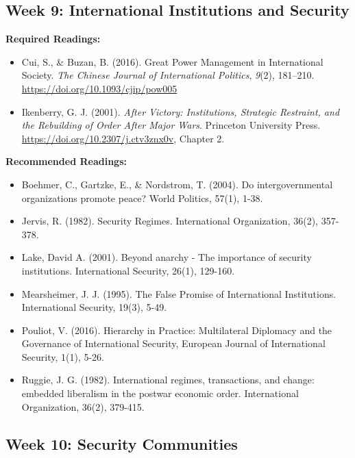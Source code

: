 \documentclass[
  letterpaper,
  DIV=11,
  numbers=noendperiod]{scrartcl}
\providecommand{\tightlist}{%
  \setlength{\itemsep}{0pt}\setlength{\parskip}{0pt}}\usepackage{longtable,booktabs,array}
\begin{document}
\hypertarget{week-9-international-institutions-and-security}{%
\subsection*{Week 9: International Institutions and
Security}\label{week-9-international-institutions-and-security}}

\textbf{Required Readings:}

\begin{itemize}
\tightlist
\item
  Cui, S., \& Buzan, B. (2016). Great {Power} {Management} in
  {International} {Society}. \emph{The Chinese Journal of International
  Politics}, \emph{9}(2), 181--210.
  \url{https://doi.org/10.1093/cjip/pow005}
\item
  Ikenberry, G. J. (2001). \emph{After {Victory}: {Institutions},
  {Strategic} {Restraint}, and the {Rebuilding} of {Order} {After}
  {Major} {Wars}}. Princeton University Press.
  \url{https://doi.org/10.2307/j.ctv3znx0v}, Chapter 2.
\end{itemize}

\textbf{Recommended Readings:}

\begin{itemize}
\tightlist
\item
  Boehmer, C., Gartzke, E., \& Nordstrom, T. (2004). Do
  intergovernmental organizations promote peace? World Politics, 57(1),
  1-38.
\item
  Jervis, R. (1982). Security Regimes. International Organization,
  36(2), 357-378.
\item
  Lake, David A. (2001). Beyond anarchy - The importance of security
  institutions. International Security, 26(1), 129-160.
\item
  Mearsheimer, J. J. (1995). The False Promise of International
  Institutions. International Security, 19(3), 5-49.
\item
  Pouliot, V. (2016). Hierarchy in Practice: Multilateral Diplomacy and
  the Governance of International Security, European Journal of
  International Security, 1(1), 5-26.
\item
  Ruggie, J. G. (1982). International regimes, transactions, and change:
  embedded liberalism in the postwar economic order. International
  Organization, 36(2), 379-415.
\end{itemize}

\hypertarget{week-10-security-communities}{%
\subsection*{Week 10: Security
Communities}\label{week-10-security-communities}}
\end{document}
